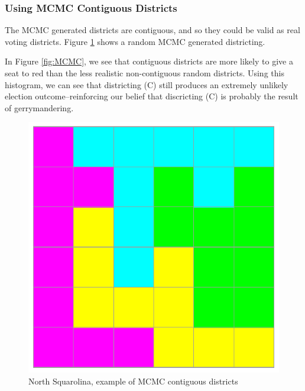 \documentclass[12pt]{article}
\begin{document}
\subsubsection{Using MCMC Contiguous Districts}
The MCMC generated districts are contiguous, and so they could be valid as real voting districts. Figure \ref{fig:mcmc_district} shows a random MCMC generated districting.
\par In Figure \ref{fig:MCMC}, we see that contiguous districts are more likely to give a seat to red than the less realistic non-contiguous random districts. Using this histogram, we can see that districting (C) still produces an extremely unlikely election outcome--reinforcing our belief that discricting (C) is probably the result of gerrymandering.

    \begin{figure}[h!]
    \centering
    \includegraphics[scale=0.5]{mcmc_districting.pdf}
    \caption{North Squarolina, example of MCMC contiguous districts}
    \label{fig:mcmc_district}
    \end{figure}
\end{document}
